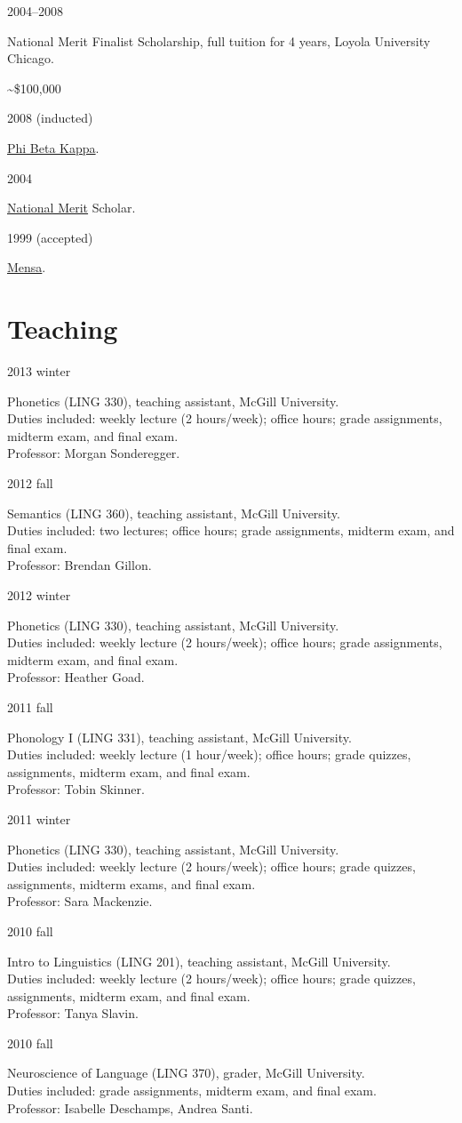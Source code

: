 \documentclass[11pt,letterpaper]{article}
\newcommand{\cvitem}[2]{%
  \begin{minipage}[t]{0.24\textwidth}
    #1 %
  \end{minipage}
  \hfill
  \begin{minipage}[t]{0.74\textwidth}
    #2 %
  \end{minipage}
}
\newcommand{\tadetails}[2]{%
  {\footnotesize Duties included: #1. \\ Professor: #2.}
}
\newcommand{\award}[2]{%
  \begin{minipage}[t]{0.78\textwidth}
    #1        %
  \end{minipage}
  \hfill
  \begin{minipage}[t]{0.20\textwidth}
    \hfill #2 %
  \end{minipage}
}
\begin{document}
\cvitem{2004--2008}{\award{National Merit Finalist Scholarship, full tuition for
4 years, Loyola University Chicago.}{\textasciitilde\$100,000}}

\cvitem{2008 (inducted)}{\href{http://www.pbk.org/}{Phi Beta Kappa}.}

\cvitem{2004}{\href{http://www.nationalmerit.org/}{National Merit} Scholar.}

\cvitem{1999 (accepted)}{\href{http://www.mensa.org/}{Mensa}.}



\section*{Teaching}

\cvitem{2013 winter}{Phonetics (LING 330), teaching assistant, McGill
  University. \\ \tadetails{weekly lecture (2 hours/week); office hours; grade
  assignments, midterm exam, and final exam}{Morgan Sonderegger}}

\cvitem{2012 fall}{Semantics (LING 360), teaching assistant, McGill University.
  \\ \tadetails{two lectures; office hours; grade assignments, midterm exam,
  and final exam}{Brendan Gillon}}

\cvitem{2012 winter}{Phonetics (LING 330), teaching assistant, McGill
  University. \\ \tadetails{weekly lecture (2 hours/week); office hours; grade
  assignments, midterm exam, and final exam}{Heather Goad}}

\cvitem{2011 fall}{Phonology I (LING 331), teaching assistant, McGill
  University. \\ \tadetails{weekly lecture (1 hour/week); office hours; grade
  quizzes, assignments, midterm exam, and final exam}{Tobin Skinner}}

\cvitem{2011 winter}{Phonetics (LING 330), teaching assistant, McGill
  University. \\ \tadetails{weekly lecture (2 hours/week); office hours; grade
  quizzes, assignments, midterm exams, and final exam}{Sara Mackenzie}}

\cvitem{2010 fall}{Intro to Linguistics (LING 201), teaching assistant, McGill
  University. \\ \tadetails{weekly lecture (2 hours/week); office hours; grade
  quizzes, assignments, midterm exam, and final exam}{Tanya Slavin}}

\cvitem{2010 fall}{Neuroscience of Language (LING 370), grader, McGill
  University. \\ \tadetails{grade assignments, midterm exam, and final
  exam}{Isabelle Deschamps, Andrea Santi}}
\end{document}

